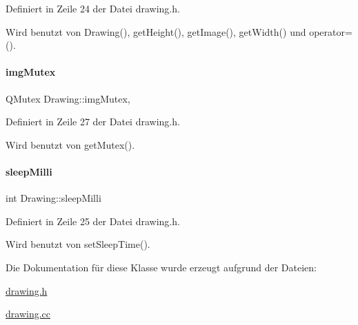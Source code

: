 Definiert in Zeile 24 der Datei drawing.\+h.



Wird benutzt von Drawing(), get\+Height(), get\+Image(), get\+Width() und operator=().

\mbox{\label{classDrawing_a1a0a2569cbbab72dffcd088df14428de}} 
\paragraph{\texorpdfstring{img\+Mutex}{imgMutex}}
{\footnotesize\ttfamily Q\+Mutex Drawing\+::img\+Mutex\hspace{0.3cm}{\ttfamily [mutable]}, {\ttfamily [private]}}



Definiert in Zeile 27 der Datei drawing.\+h.



Wird benutzt von get\+Mutex().

\mbox{\label{classDrawing_a7a904cbe419acdcd9187f1334b0b632c}} 
\paragraph{\texorpdfstring{sleep\+Milli}{sleepMilli}}
{\footnotesize\ttfamily int Drawing\+::sleep\+Milli\hspace{0.3cm}{\ttfamily [private]}}



Definiert in Zeile 25 der Datei drawing.\+h.



Wird benutzt von set\+Sleep\+Time().



Die Dokumentation für diese Klasse wurde erzeugt aufgrund der Dateien\+:\begin{DoxyCompactItemize}
\item 
\mbox{\hyperlink{drawing_8h}{drawing.\+h}}\item 
\mbox{\hyperlink{drawing_8cc}{drawing.\+cc}}\end{DoxyCompactItemize}
